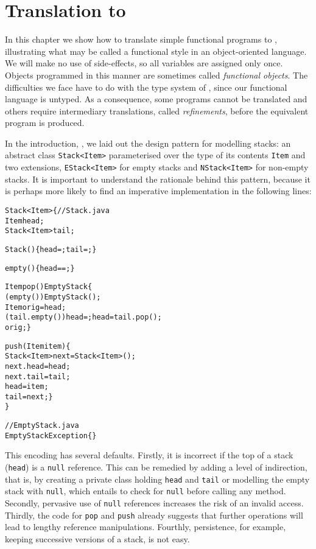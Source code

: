\chapter{Translation to \Java}

In this chapter we show how to translate simple functional programs to
\Java, illustrating what may be called a functional style in an
object\hyp{}oriented language. We will make no use of
side\hyp{}effects, so all variables are assigned only once. Objects
programmed in this manner are sometimes called \emph{functional
  objects}. The difficulties we face have to do with the type system
of \Java, since our functional language is untyped. As a consequence,
some programs cannot be translated and others require intermediary
translations, called \emph{refinements}, before the equivalent \Java
program is produced.

In the introduction, , we laid out the design
pattern for modelling stacks: an abstract class \texttt{Stack<Item>}
parameterised over the type of its contents \texttt{Item} and two
extensions, \texttt{EStack<Item>} for empty stacks and
\texttt{NStack<Item>} for non\hyp{}empty stacks. It is important to
understand the rationale behind this pattern, because it is perhaps
more likely to find an imperative implementation in the following
lines:
\begin{alltt}
\public \class Stack<Item> \{\hfill// Stack.java
  \private Item head;
  \private Stack<Item> tail;

  \public Stack() \{ head = \nullX; tail = \nullX; \}

  \public \booleanX empty() \{ \return head == \nullX; \}

  \public Item pop() \throws EmptyStack \{
    \ifX (empty()) \throw \new EmptyStack();
    \final Item orig = head;
    \ifX (tail.empty()) head = \nullX; \elseX head = tail.pop();
    \return orig; \}

  \public \void push(\final Item item) \{
    Stack<Item> next = \new Stack<Item>();
    next.head = head;
    next.tail = tail;
    head = item;
    tail = next; \}
\}

// EmptyStack.java
\public \class EmptyStack \extends Exception \{\} 
\end{alltt}
This encoding has several defaults. Firstly, it is incorrect if the
top of a stack (\texttt{head}) is a \texttt{null} reference. This can
be remedied by adding a level of indirection, that is, by creating a
private class holding \texttt{head} and \texttt{tail} or modelling the
empty stack with \texttt{null}, which entails to check for
\texttt{null} before calling any method. Secondly, pervasive use of
\texttt{null} references increases the risk of an invalid
access. Thirdly, the code for \texttt{pop} and \texttt{push} already
suggests that further operations will lead to lengthy reference
manipulations. Fourthly, persistence, for example, keeping successive
versions of a stack, is not easy.

